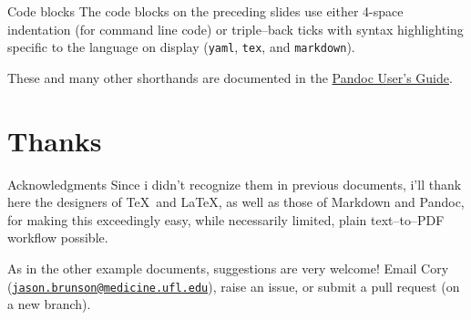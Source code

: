 \documentclass[
  ignorenonframetext,
  aspectratio=169,
]{beamer}
\begin{document}
\begin{frame}[fragile]{Code blocks}
\protect\hypertarget{code-blocks}{}
The code blocks on the preceding slides use either 4-space indentation
(for command line code) or triple--back ticks with syntax highlighting
specific to the language on display (\texttt{yaml}, \texttt{tex}, and
\texttt{markdown}).

These and many other shorthands are documented in the
\href{https://pandoc.org/MANUAL.html}{Pandoc User's Guide}.
\end{frame}

\hypertarget{thanks}{%
\section{Thanks}\label{thanks}}

\begin{frame}{Acknowledgments}
\protect\hypertarget{acknowledgments}{}
Since i didn't recognize them in previous documents, i'll thank here the
designers of \TeX~and \LaTeX, as well as those of Markdown and Pandoc,
for making this exceedingly easy, while necessarily limited, plain
text--to--PDF workflow possible.

As in the other example documents, suggestions are very welcome! Email
Cory
(\href{mailto:jason.brunson@medicine.ufl.edu}{\nolinkurl{jason.brunson@medicine.ufl.edu}}),
raise an issue, or submit a pull request (on a new branch).
\end{frame}
\end{document}

